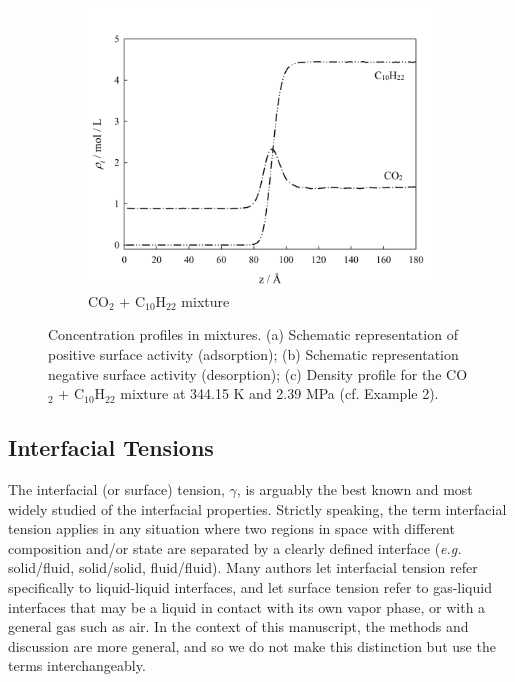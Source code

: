 \documentclass[9pt,bestpractices]{livecoms}
\begin{document}
\begin{figure}
\begin{subfigure}{0.4\textwidth}
    \includegraphics[width=1\textwidth]{gfx/image4.png}
		\caption{CO$_{2}$ + C$_{10}$H$_{22}$ mixture} %
	\end{subfigure}
  \caption{Concentration profiles in mixtures. (a) Schematic representation of positive surface activity (adsorption); (b) Schematic representation negative surface activity (desorption); (c) Density profile for the CO$_{2}$ + C$_{10}$H$_{22}$ mixture at 344.15 K and 2.39 MPa (cf. Example 2).} %
  \label{fig:2}
\end{figure}

\subsection{Interfacial Tensions}
The interfacial (or surface) tension, $\gamma$, is arguably the best known and
most widely studied of the interfacial properties. Strictly speaking, the term
interfacial tension applies in any situation where two regions in space with
different composition and/or state are separated by a clearly defined interface
(\textit{e.g.} solid/fluid, solid/solid, fluid/fluid). Many authors let
interfacial tension refer specifically to liquid-liquid
interfaces, and let surface tension refer to gas-liquid interfaces that may be 
a liquid in contact with its own vapor phase, or with a general gas such as air.
In the context of this manuscript, the methods and discussion are more general,
and so we do not make this distinction but use the terms interchangeably.
\end{document}
